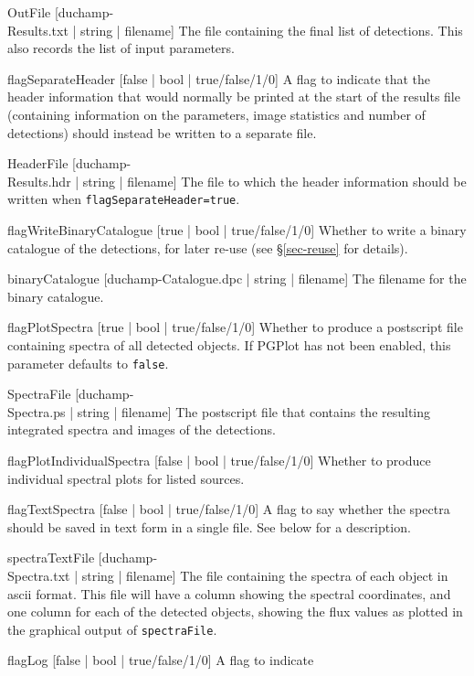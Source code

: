 \begin{Lentry}
\item[{OutFile [duchamp-\\Results.txt | string | filename]}] The file
  containing the final list of detections. This also records the list
  of input parameters.
\item[{flagSeparateHeader [false | bool | true/false/1/0]}] A flag to
  indicate that the header information that would normally be printed
  at the start of the results file (containing information on the
  parameters, image statistics and number of detections) should
  instead be written to a separate file.
\item[{HeaderFile [duchamp-\\Results.hdr | string | filename]}] The
  file to which the header information should be written when
  \texttt{flagSeparateHeader=true}.
\item[{flagWriteBinaryCatalogue [true | bool | true/false/1/0]}]
  Whether to write a binary catalogue of the detections, for later
  re-use (see \S\ref{sec-reuse} for details).
\item[{binaryCatalogue [duchamp-Catalogue.dpc | string | filename]}]
  The filename for the binary catalogue.
\item[{flagPlotSpectra [true | bool | true/false/1/0]}] Whether to
  produce a postscript file containing spectra of all detected
  objects. If PGPlot has not been enabled, this parameter defaults to
  \texttt{false}.
\item[{SpectraFile [duchamp-\\Spectra.ps | string | filename]}] The
  postscript file that contains the resulting integrated spectra and
  images of the detections.
\item[{flagPlotIndividualSpectra [false | bool | true/false/1/0]}]
  Whether to produce individual spectral plots for listed sources.
\item[{flagTextSpectra [false | bool | true/false/1/0]}] A flag to say
  whether the spectra should be saved in text form in a single
  file. See below for a description.
\item[{spectraTextFile [duchamp-\\Spectra.txt | string | filename]}]
  The file containing the spectra of each object in ascii format. This
  file will have a column showing the spectral coordinates, and one
  column for each of the detected objects, showing the flux values as
  plotted in the graphical output of \texttt{spectraFile}.
\item[{flagLog [false | bool | true/false/1/0]}] A flag to indicate

\end{Lentry}
